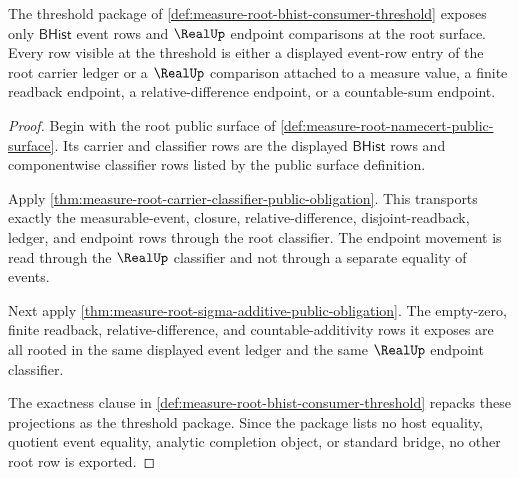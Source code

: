 \begin{theorem}
\label{thm:measure-root-bhist-real-endpoint-threshold}
The threshold package of
\autoref{def:measure-root-bhist-consumer-threshold} exposes only
$\mathsf{BHist}$ event rows and $\RealUp$ endpoint comparisons at the root
surface. Every row visible at the threshold is either a displayed event-row
entry of the root carrier ledger or a $\RealUp$ comparison attached to a
measure value, a finite readback endpoint, a relative-difference endpoint, or
a countable-sum endpoint.
\end{theorem}
\begin{proof}
Begin with the root public surface of
\autoref{def:measure-root-namecert-public-surface}. Its carrier and classifier
rows are the displayed $\mathsf{BHist}$ rows and componentwise classifier rows
listed by the public surface definition.

Apply \autoref{thm:measure-root-carrier-classifier-public-obligation}. This
transports exactly the measurable-event, closure, relative-difference,
disjoint-readback, ledger, and endpoint rows through the root classifier. The
endpoint movement is read through the $\RealUp$ classifier and not through a
separate equality of events.

Next apply \autoref{thm:measure-root-sigma-additive-public-obligation}. The
empty-zero, finite readback, relative-difference, and countable-additivity rows
it exposes are all rooted in the same displayed event ledger and the same
$\RealUp$ endpoint classifier.

The exactness clause in
\autoref{def:measure-root-bhist-consumer-threshold} repacks these projections
as the threshold package. Since the package lists no host equality, quotient
event equality, analytic completion object, or standard bridge, no other root
row is exported.
\end{proof}

